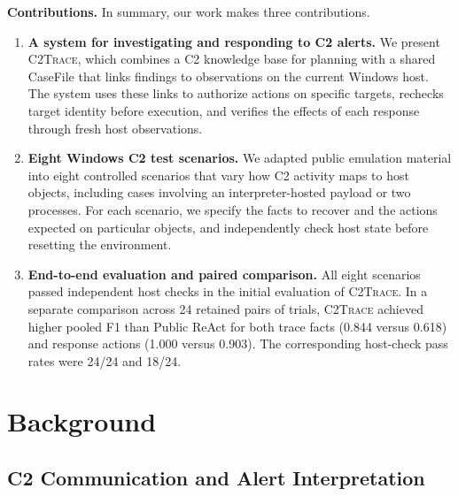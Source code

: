 \documentclass[pdflatex,sn-basic]{sn-jnl}
\DeclareRobustCommand{\circled}[1]{\textcircled{\scriptsize #1}}
\newcommand{\system}{\textsc{C2Trace}\xspace}
\begin{document}
\noindent\textbf{Contributions.} In summary, our work makes three contributions.
\begin{enumerate}[noitemsep, topsep=1pt, partopsep=1pt, listparindent=\parindent, leftmargin=*, label=\circled{\arabic*}]
  \item \textbf{A system for investigating and responding to C2 alerts.} We present \system, which combines a C2 knowledge base for planning with a shared CaseFile that links findings to observations on the current Windows host. The system uses these links to authorize actions on specific targets, rechecks target identity before execution, and verifies the effects of each response through fresh host observations.
  \item \textbf{Eight Windows C2 test scenarios.} We adapted public emulation material into eight controlled scenarios that vary how C2 activity maps to host objects, including cases involving an interpreter-hosted payload or two processes. For each scenario, we specify the facts to recover and the actions expected on particular objects, and independently check host state before resetting the environment.
  \item \textbf{End-to-end evaluation and paired comparison.} All eight scenarios passed independent host checks in the initial evaluation of \system. In a separate comparison across 24 retained pairs of trials, \system achieved higher pooled F1 than Public ReAct for both trace facts (0.844 versus 0.618) and response actions (1.000 versus 0.903). The corresponding host-check pass rates were 24/24 and 18/24.
\end{enumerate}

\section{Background}
\label{sec:background}

\subsection{C2 Communication and Alert Interpretation}
\label{sec:background-c2}
\end{document}

